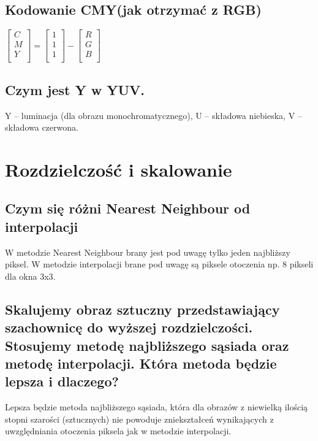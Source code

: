 \documentclass[a4paper, 12pt, titlepage]{article}
\begin{document}
\subsection{Kodowanie CMY(jak otrzymać z RGB)}
$\begin{bmatrix} C \\ M \\ Y \\ \end{bmatrix} 
= \begin{bmatrix} 1 \\ 1 \\ 1 \\ \end{bmatrix}
- \begin{bmatrix} R \\ G \\ B \\ \end{bmatrix} $

\subsection{Czym jest Y w YUV.}
Y – luminacja (dla obrazu monochromatycznego), U – składowa niebieska, V – składowa czerwona.

\pagebreak\section{Rozdzielczość i skalowanie}

\subsection{Czym się różni Nearest Neighbour od interpolacji}
W metodzie Nearest Neighbour brany jest pod uwagę tylko jeden najbliższy piksel. W metodzie interpolacji brane pod uwagę są piksele otoczenia np. 8 pikseli dla okna 3x3.

\subsection{Skalujemy obraz sztuczny przedstawiający szachownicę do wyższej rozdzielczości. Stosujemy metodę najbliższego sąsiada oraz metodę interpolacji. Która metoda będzie lepsza i dlaczego?}
Lepsza będzie metoda najbliższego sąsiada, która dla obrazów z niewielką ilością stopni szarości (sztucznych) nie powoduje zniekształceń wynikających z uwzględniania otoczenia piksela jak w metodzie interpolacji.
\end{document}
